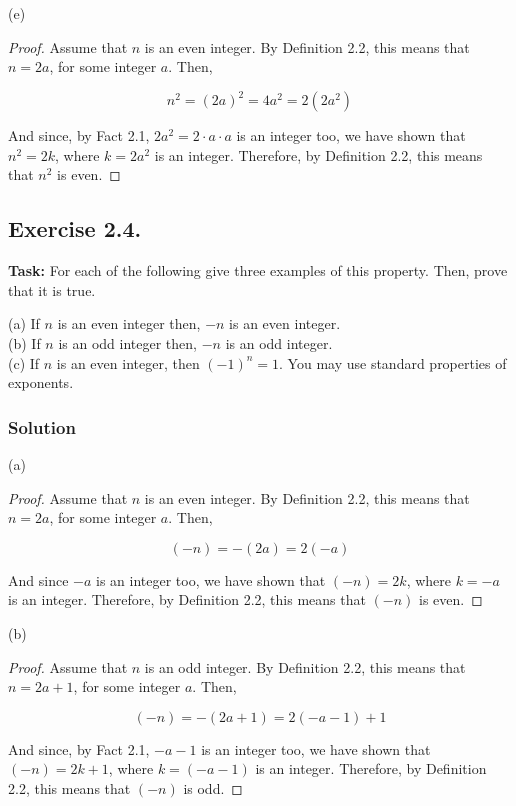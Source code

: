 \documentclass{article}
\begin{document}
\noindent(e)

\begin{proof}
    Assume that $n$ is an even integer. By Definition 2.2, this means that $n=2a$, for some integer $a$. Then,

    \[n^2=(2a)^2=4a^2=2(2a^2)\]

    And since, by Fact 2.1, $2a^2=2 \cdot a \cdot a$ is an integer too, we have shown that $n^2=2k$, where $k=2a^2$ is an integer. Therefore, by Definition 2.2, this means that $n^2$ is even.
\end{proof}

\subsection{Exercise 2.4.} 
\textbf{Task:} For each of the following give three examples of this property. Then, prove that it is true.

\noindent (a) If $n$ is an even integer then, $-n$ is an even integer.\\
(b) If $n$ is an odd integer then, $-n$ is an odd integer. \\
(c) If $n$ is an even integer, then $(-1)^n=1$. You may use standard properties of exponents.

\subsubsection*{Solution}

(a) 

\begin{proof}
    Assume that $n$ is an even integer. By Definition 2.2, this means that $n=2a$, for some integer $a$. Then,

    \[(-n)=-(2a)=2(-a)\]

    And since $-a$ is an integer too, we have shown that $(-n)=2k$, where $k=-a$ is an integer. Therefore, by Definition 2.2, this means that $(-n)$ is even.
    
\end{proof}

\newpage

\noindent (b) 

\begin{proof}
    Assume that $n$ is an odd integer. By Definition 2.2, this means that $n=2a+1$, for some integer $a$. Then,

    \[(-n)=-(2a+1)=2(-a-1)+1\]

    And since, by Fact 2.1, $-a-1$ is an integer too, we have shown that $(-n)=2k+1$, where $k=(-a-1)$ is an integer. Therefore, by Definition 2.2, this means that $(-n)$ is odd.
\end{proof}
\end{document}
